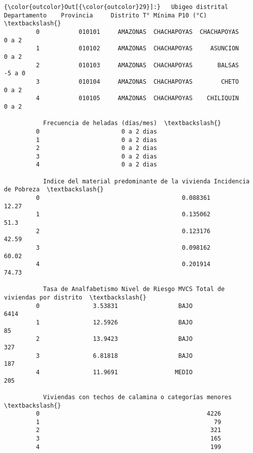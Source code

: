 \documentclass[11pt]{article}
\begin{document}
\begin{Verbatim}[commandchars=\\\{\}]
{\color{outcolor}Out[{\color{outcolor}29}]:}   Ubigeo distrital Departamento    Provincia     Distrito T° Mínima P10 (°C)  \textbackslash{}
         0           010101     AMAZONAS  CHACHAPOYAS  CHACHAPOYAS              0 a 2   
         1           010102     AMAZONAS  CHACHAPOYAS     ASUNCION              0 a 2   
         2           010103     AMAZONAS  CHACHAPOYAS       BALSAS             -5 a 0   
         3           010104     AMAZONAS  CHACHAPOYAS        CHETO              0 a 2   
         4           010105     AMAZONAS  CHACHAPOYAS    CHILIQUIN              0 a 2   
         
           Frecuencia de heladas (días/mes)  \textbackslash{}
         0                       0 a 2 dias   
         1                       0 a 2 dias   
         2                       0 a 2 dias   
         3                       0 a 2 dias   
         4                       0 a 2 dias   
         
           Indice del material predominante de la vivienda Incidencia de Pobreza  \textbackslash{}
         0                                        0.088361                 12.27   
         1                                        0.135062                  51.3   
         2                                        0.123176                 42.59   
         3                                        0.098162                 60.02   
         4                                        0.201914                 74.73   
         
           Tasa de Analfabetismo Nivel de Riesgo MVCS Total de viviendas por distrito  \textbackslash{}
         0               3.53831                 BAJO                            6414   
         1               12.5926                 BAJO                              85   
         2               13.9423                 BAJO                             327   
         3               6.81818                 BAJO                             187   
         4               11.9691                MEDIO                             205   
         
           Viviendas con techos de calamina o categorías menores  \textbackslash{}
         0                                               4226      
         1                                                 79      
         2                                                321      
         3                                                165      
         4                                                199      
         

\end{Verbatim}
\end{document}
